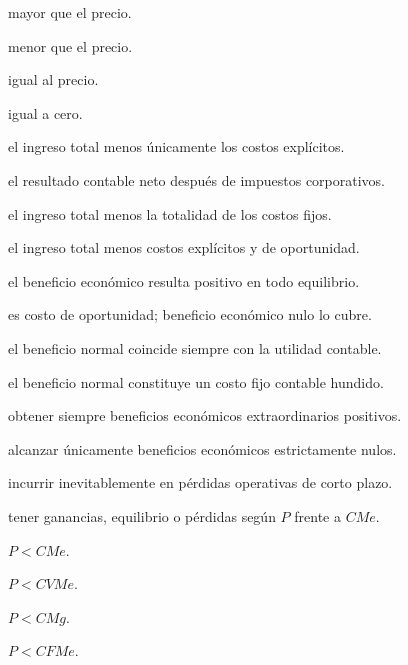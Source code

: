 \begin{opts}
    \item mayor que el precio.
    \item menor que el precio.
    \item igual al precio.
    \item igual a cero.
\end{opts}

\begin{opts}
    \item el ingreso total menos únicamente los costos explícitos.
    \item el resultado contable neto después de impuestos corporativos.
    \item el ingreso total menos la totalidad de los costos fijos.
    \item el ingreso total menos costos explícitos y de oportunidad.
\end{opts}

\begin{opts}
    \item el beneficio económico resulta positivo en todo equilibrio.
    \item es costo de oportunidad; beneficio económico nulo lo cubre.
    \item el beneficio normal coincide siempre con la utilidad contable.
    \item el beneficio normal constituye un costo fijo contable hundido.
\end{opts}

\begin{opts}
    \item obtener siempre beneficios económicos extraordinarios positivos.
    \item alcanzar únicamente beneficios económicos estrictamente nulos.
    \item incurrir inevitablemente en pérdidas operativas de corto plazo.
    \item tener ganancias, equilibrio o pérdidas según $P$ frente a $CMe$.
\end{opts}

\begin{opts}
    \item $P<CMe$.
    \item $P<CVMe$.
    \item $P<CMg$.
    \item $P<CFMe$.
\end{opts}

